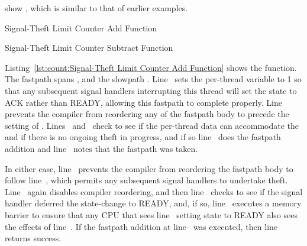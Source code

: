 \QuickQuizEnd

\begin{fcvref}
 show , which is similar to that of
earlier examples.
\end{fcvref}

\begin{listing}[tbp]

\caption{Signal-Theft Limit Counter Add Function}
\label{lst:count:Signal-Theft Limit Counter Add Function}
\end{listing}

\begin{listing}[tb]

\caption{Signal-Theft Limit Counter Subtract Function}
\label{lst:count:Signal-Theft Limit Counter Subtract Function}
\end{listing}

\begin{fcvref}
Listing~\ref{lst:count:Signal-Theft Limit Counter Add Function}
shows the  function.
The fastpath spans , and the slowpath
.
Line~ sets the per-thread  variable to 1 so that
any subsequent signal handlers interrupting this thread will
set the  state to ACK rather than READY, allowing this
fastpath to complete properly.
Line~ prevents the compiler from reordering any of the fastpath body
to precede the setting of .
Lines~ and~ check to see
if the per-thread data can accommodate
the  and if there is no ongoing theft in progress,
and if so line~ does the fastpath addition and
line~ notes that
the fastpath was taken.

In either case, line~ prevents the compiler from reordering the
fastpath body to follow line~, which permits any subsequent signal
handlers to undertake theft.
Line~ again disables compiler reordering, and then
line~
checks to see if the signal handler deferred the 
state-change to READY, and, if so, line~ executes a memory
barrier to ensure that any CPU that sees line~ setting state to
READY also sees the effects of line~.
If the fastpath addition at line~ was executed, then
line~ returns
success.
\end{fcvref}

